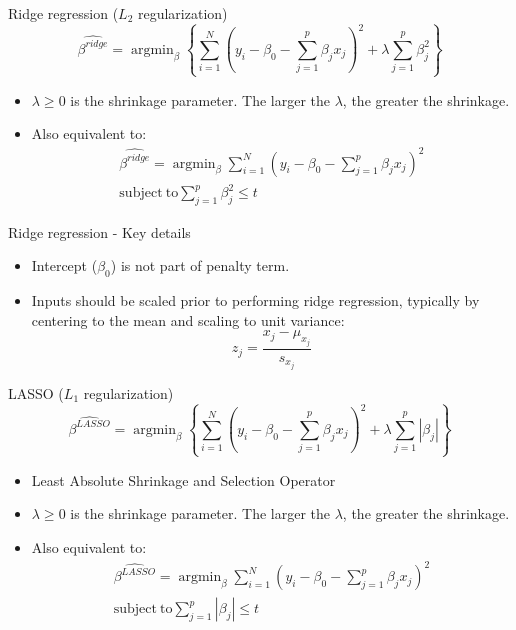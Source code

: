 \documentclass[aspectratio=169]{beamer}
\DeclareMathOperator*{\argmin}{argmin}
\begin{document}
\begin{frame}{Ridge regression ($L_2$ regularization)}
    \begin{equation*}
        \hat{\beta^{ridge}} = \argmin_\beta \left \{ \sum_{i=1}^N (y_i - \beta_0 - \sum_{j=1}^p \beta_j x_j)^2 + \lambda \sum_{j=1}^p \beta_j^2 \right \}
    \end{equation*}
    \begin{itemize}
        \item $\lambda \geq 0$ is the shrinkage parameter. The larger the $\lambda$, the greater the shrinkage.
        \item Also equivalent to:
        \begin{eqnarray*}
        \hat{\beta^{ridge}} = \argmin_\beta \sum_{i=1}^N (y_i - \beta_0 - \sum_{j=1}^p \beta_j x_j)^2\\
        \mathrm{subject~to} \sum_{j=1}^p \beta_j^2 \leq t
        \end{eqnarray*}
    \end{itemize}
\end{frame}


\begin{frame}{Ridge regression - Key details}
    \begin{itemize}
        \item Intercept ($\beta_0$) is not part of penalty term.
        \item Inputs should be scaled prior to performing ridge regression, typically by centering to the mean and scaling to unit variance:
        \begin{equation*}
            z_j = \frac{x_j - \mu_{x_j}}{s_{x_j}}
        \end{equation*}
    \end{itemize}
\end{frame}


\begin{frame}{LASSO ($L_1$ regularization)}
    \begin{equation*}
        \hat{\beta^{LASSO}} = \argmin_\beta \left \{ \sum_{i=1}^N (y_i - \beta_0 - \sum_{j=1}^p \beta_j x_j)^2 + \lambda \sum_{j=1}^p |\beta_j| \right \}
    \end{equation*}
    \begin{itemize}
        \item Least Absolute Shrinkage and Selection Operator
        \item $\lambda \geq 0$ is the shrinkage parameter. The larger the $\lambda$, the greater the shrinkage.
        \item Also equivalent to:
        \begin{eqnarray*}
        \hat{\beta^{LASSO}} = \argmin_\beta \sum_{i=1}^N (y_i - \beta_0 - \sum_{j=1}^p \beta_j x_j)^2\\
        \mathrm{subject~to} \sum_{j=1}^p |\beta_j| \leq t
        \end{eqnarray*}
    \end{itemize}
\end{frame}
\end{document}
